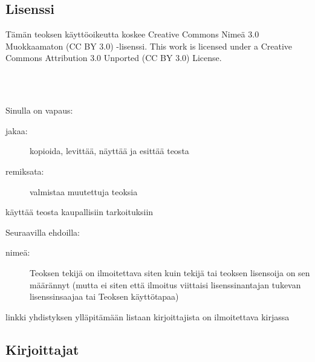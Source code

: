 \subsection*{Lisenssi}

Tämän teoksen käyttöoikeutta koskee Creative Commons Nimeä 3.0 Muokkaamaton (CC BY 3.0) -lisenssi.
This work is licensed under a Creative Commons Attribution 3.0 Unported (CC BY 3.0) License.

 \\
 \\

Sinulla on vapaus:
\begin{description}
\item[jakaa:] kopioida, levittää, näyttää ja esittää teosta
\item[remiksata:] valmistaa muutettuja teoksia
\item[käyttää teosta kaupallisiin tarkoituksiin]
\end{description}
Seuraavilla ehdoilla:
\begin{description}
\item[nimeä:] Teoksen tekijä on ilmoitettava siten kuin tekijä tai teoksen lisensoija on sen määrännyt (mutta ei siten että ilmoitus viittaisi lisenssinantajan tukevan lisenssinsaajaa tai Teoksen käyttötapaa)
\item[linkki yhdistyksen ylläpitämään listaan kirjoittajista on ilmoitettava kirjassa]
\end{description}

\subsection*{Kirjoittajat}

